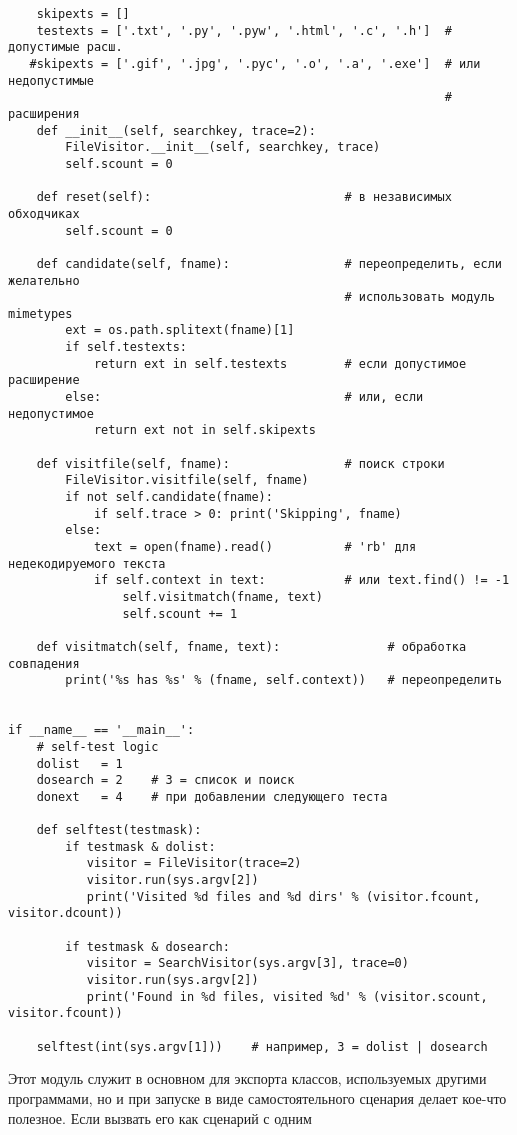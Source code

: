 \documentclass[12pt]{article}
\begin{document}
\begin{verbatim}
    skipexts = []
    testexts = ['.txt', '.py', '.pyw', '.html', '.c', '.h']  # допустимые расш.
   #skipexts = ['.gif', '.jpg', '.pyc', '.o', '.a', '.exe']  # или недопустимые
															 # расширения
    def __init__(self, searchkey, trace=2):
        FileVisitor.__init__(self, searchkey, trace)
        self.scount = 0

    def reset(self):                           # в независимых обходчиках
        self.scount = 0

    def candidate(self, fname):                # переопределить, если желательно 
    										   # использовать модуль mimetypes
        ext = os.path.splitext(fname)[1]
        if self.testexts:
            return ext in self.testexts        # если допустимое расширение
        else:                                  # или, если недопустимое
            return ext not in self.skipexts
         
    def visitfile(self, fname):                # поиск строки
        FileVisitor.visitfile(self, fname)
        if not self.candidate(fname):
            if self.trace > 0: print('Skipping', fname)
        else:
            text = open(fname).read()          # 'rb' для недекодируемого текста
            if self.context in text:           # или text.find() != -1
                self.visitmatch(fname, text)
                self.scount += 1

    def visitmatch(self, fname, text):               # обработка совпадения
        print('%s has %s' % (fname, self.context))   # переопределить


if __name__ == '__main__':
    # self-test logic
    dolist   = 1
    dosearch = 2    # 3 = список и поиск
    donext   = 4    # при добавлении следующего теста

    def selftest(testmask):
        if testmask & dolist:
           visitor = FileVisitor(trace=2)
           visitor.run(sys.argv[2])
           print('Visited %d files and %d dirs' % (visitor.fcount, visitor.dcount))

        if testmask & dosearch:
           visitor = SearchVisitor(sys.argv[3], trace=0)
           visitor.run(sys.argv[2])
           print('Found in %d files, visited %d' % (visitor.scount, visitor.fcount))

    selftest(int(sys.argv[1]))    # например, 3 = dolist | dosearch
\end{verbatim}
Этот модуль служит в основном для экспорта классов, используемых
другими программами, но и при запуске в виде самостоятельного сценария делает кое-что полезное. Если вызвать его как сценарий с одним
\end{document}
